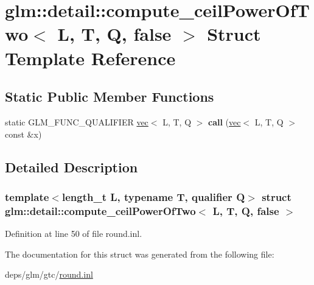 \hypertarget{structglm_1_1detail_1_1compute__ceilPowerOfTwo_3_01L_00_01T_00_01Q_00_01false_01_4}{}\section{glm\+:\+:detail\+:\+:compute\+\_\+ceil\+Power\+Of\+Two$<$ L, T, Q, false $>$ Struct Template Reference}
\label{structglm_1_1detail_1_1compute__ceilPowerOfTwo_3_01L_00_01T_00_01Q_00_01false_01_4}
\subsection*{Static Public Member Functions}
\begin{DoxyCompactItemize}
\item 
\mbox{\label{structglm_1_1detail_1_1compute__ceilPowerOfTwo_3_01L_00_01T_00_01Q_00_01false_01_4_af5cd62b52c3d45c1d7e0e0f1b83a32b4}} 
static G\+L\+M\+\_\+\+F\+U\+N\+C\+\_\+\+Q\+U\+A\+L\+I\+F\+I\+ER \hyperlink{structglm_1_1vec}{vec}$<$ L, T, Q $>$ {\bfseries call} (\hyperlink{structglm_1_1vec}{vec}$<$ L, T, Q $>$ const \&x)
\end{DoxyCompactItemize}


\subsection{Detailed Description}
\subsubsection*{template$<$length\+\_\+t L, typename T, qualifier Q$>$\newline
struct glm\+::detail\+::compute\+\_\+ceil\+Power\+Of\+Two$<$ L, T, Q, false $>$}



Definition at line 50 of file round.\+inl.



The documentation for this struct was generated from the following file\+:\begin{DoxyCompactItemize}
\item 
deps/glm/gtc/\hyperlink{round_8inl}{round.\+inl}\end{DoxyCompactItemize}
